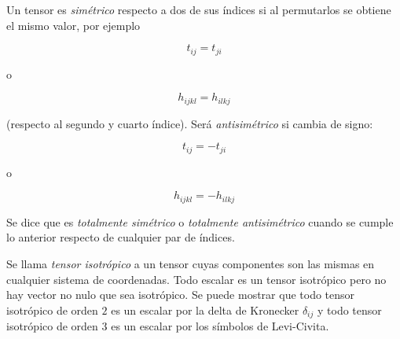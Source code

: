 Un tensor es \textit{simétrico} respecto a dos de sus índices si al permutarlos se obtiene el mismo valor, por ejemplo 


$$t_{ij}= t_{ji}$$


o 

$$ h_{ijkl}= h_{ilkj} $$

(respecto al segundo y cuarto índice).
Será \textit{antisimétrico} si cambia de signo:  

$$t_{ij}= - t_{ji}$$


o 

$$ h_{ijkl}= - h_{ilkj} $$


Se dice que es \textit{totalmente simétrico} o \textit{totalmente antisimétrico} cuando se cumple lo anterior respecto de cualquier par de índices.
\bigskip


\begin{remark}
Se llama \textit{tensor isotrópico} a un tensor cuyas componentes son las mismas en cualquier sistema de coordenadas. Todo  escalar es un tensor isotrópico pero no hay vector no nulo que sea isotrópico.
Se puede mostrar que todo tensor isotrópico de orden $2$  es un escalar por la delta de Kronecker $\delta_{ij}$ y todo tensor isotrópico de orden $3$ es un escalar por los símbolos de Levi-Civita.
\end{remark}










